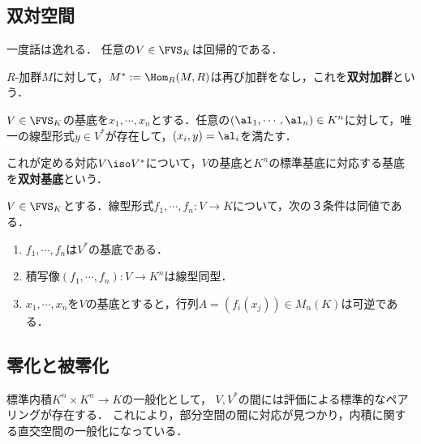 \documentclass[uplatex, dvipdfmx]{jsreport}
\begin{document}
\subsection{双対空間}

\begin{tcolorbox}[colframe=ForestGreen, colback=ForestGreen!10!white,breakable,colbacktitle=ForestGreen!40!white,coltitle=black,fonttitle=\bfseries\sffamily,
title=]
    一度話は逸れる．
    任意の$V\in\FVS_K$は回帰的である．
\end{tcolorbox}

\begin{definition}
    $R$-加群$M$に対して，$M^*:=\Hom_R(M,R)$は再び加群をなし，これを\textbf{双対加群}という．
\end{definition}

\begin{theorem}[双対空間への対応]
    $V\in\FVS_K$の基底を$x_1,\cdots,x_n$とする．任意の$(\al_1,\cdots,\al_n)\in K^n$に対して，唯一の線型形式$y\in V^*$が存在して，$(x_i,y)=\al_i$を満たす．
\end{theorem}
\begin{definition}
    これが定める対応$V\iso V^*$について，$V$の基底と$K^n$の標準基底に対応する基底を\textbf{双対基底}という．
\end{definition}

\begin{proposition}[双対基底の特徴付け]
    $V\in\FVS_K$とする．線型形式$f_1,\cdots,f_n:V\to K$について，次の３条件は同値である．
    \begin{enumerate}
        \item $f_1,\cdots,f_n$は$V^*$の基底である．
        \item 積写像$(f_1,\cdots,f_n):V\to K^n$は線型同型．
        \item $x_1,\cdots,x_n$を$V$の基底とすると，行列$A=(f_i(x_j))\in M_n(K)$は可逆である．
    \end{enumerate}
\end{proposition}

\subsection{零化と被零化}

\begin{tcolorbox}[colframe=ForestGreen, colback=ForestGreen!10!white,breakable,colbacktitle=ForestGreen!40!white,coltitle=black,fonttitle=\bfseries\sffamily,
title=]
    標準内積$K^n\times K^n\to K$の一般化として，
    $V,V^*$の間には評価による標準的なペアリングが存在する．
    これにより，部分空間の間に対応が見つかり，内積に関する直交空間の一般化になっている．
\end{tcolorbox}
\end{document}
